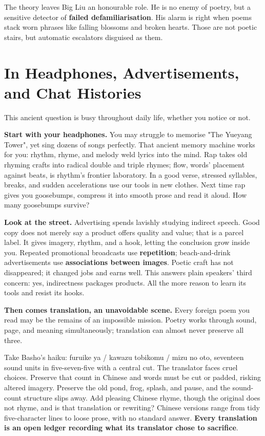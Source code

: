 The theory leaves Big Liu an honourable role. He is no enemy of poetry, but a sensitive detector of \textbf{failed defamiliarisation}. His alarm is right when poems stack worn phrases like falling blossoms and broken hearts. Those are not poetic stairs, but automatic escalators disguised as them.

\section[Headphones, Ads, and Chats]{In Headphones, Advertisements, and Chat Histories}
This ancient question is busy throughout daily life, whether you notice or not.

\textbf{Start with your headphones.} You may struggle to memorise "The Yueyang Tower", yet sing dozens of songs perfectly. That ancient memory machine works for you: rhythm, rhyme, and melody weld lyrics into the mind. Rap takes old rhyming crafts into radical double and triple rhymes; flow, words' placement against beats, is rhythm's frontier laboratory. In a good verse, stressed syllables, breaks, and sudden accelerations use our tools in new clothes. Next time rap gives you goosebumps, compress it into smooth prose and read it aloud. How many goosebumps survive?

\textbf{Look at the street.} Advertising spends lavishly studying indirect speech. Good copy does not merely say a product offers quality and value; that is a parcel label. It gives imagery, rhythm, and a hook, letting the conclusion grow inside you. Repeated promotional broadcasts use \textbf{repetition}; beach-and-drink advertisements use \textbf{associations between images}. Poetic craft has not disappeared; it changed jobs and earns well. This answers plain speakers' third concern: yes, indirectness packages products. All the more reason to learn its tools and resist its hooks.

\textbf{Then comes translation, an unavoidable scene.} Every foreign poem you read may be the remains of an impossible mission. Poetry works through sound, page, and meaning simultaneously; translation can almost never preserve all three.

Take Basho's haiku: furuike ya / kawazu tobikomu / mizu no oto, seventeen sound units in five-seven-five with a central cut. The translator faces cruel choices. Preserve that count in Chinese and words must be cut or padded, risking altered imagery. Preserve the old pond, frog, splash, and pause, and the sound-count structure slips away. Add pleasing Chinese rhyme, though the original does not rhyme, and is that translation or rewriting? Chinese versions range from tidy five-character lines to loose prose, with no standard answer. \textbf{Every translation is an open ledger recording what its translator chose to sacrifice}.

